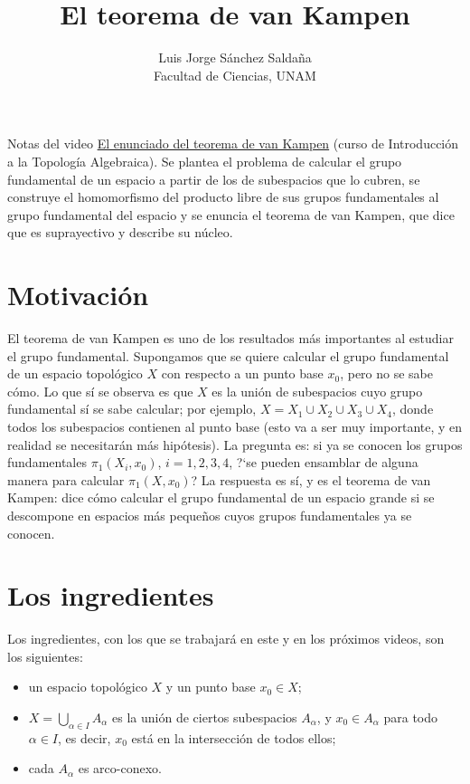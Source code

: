 \documentclass[11pt]{article}
\title{El teorema de van Kampen}
\author{Luis Jorge Sánchez Saldaña\\[2pt]\small Facultad de Ciencias, UNAM}
\date{}
\begin{document}
\maketitle

\noindent\small Notas del video
\href{https://www.youtube.com/watch?v=GbrKtJxBENo}{\guillemotleft{}El enunciado del teorema de van Kampen\guillemotright{}}
(curso de Introducción a la Topología Algebraica). Se plantea el problema de calcular el grupo fundamental de un espacio a partir de los de subespacios que lo cubren, se construye el homomorfismo del producto libre de sus grupos fundamentales al grupo fundamental del espacio y se enuncia el teorema de van Kampen, que dice que es suprayectivo y describe su núcleo.
\normalsize

\section*{Motivación}

El teorema de van Kampen es uno de los resultados más importantes al estudiar el grupo fundamental. Supongamos que se quiere calcular el grupo fundamental de un espacio topológico $X$ con respecto a un punto base $x_0$, pero no se sabe cómo. Lo que sí se observa es que $X$ es la unión de subespacios cuyo grupo fundamental sí se sabe calcular; por ejemplo, $X=X_1\cup X_2\cup X_3\cup X_4$, donde todos los subespacios contienen al punto base (esto va a ser muy importante, y en realidad se necesitarán más hipótesis). La pregunta es: si ya se conocen los grupos fundamentales $\pi_1(X_i,x_0)$, $i=1,2,3,4$, ?`se pueden ensamblar de alguna manera para calcular $\pi_1(X,x_0)$? La respuesta es sí, y es el teorema de van Kampen: dice cómo calcular el grupo fundamental de un espacio grande si se descompone en espacios más pequeños cuyos grupos fundamentales ya se conocen.

\section*{Los ingredientes}

Los ingredientes, con los que se trabajará en este y en los próximos videos, son los siguientes:
\begin{itemize}
  \item un espacio topológico $X$ y un punto base $x_0\in X$;
  \item $X=\bigcup_{\alpha\in I}A_\alpha$ es la unión de ciertos subespacios $A_\alpha$, y $x_0\in A_\alpha$ para todo $\alpha\in I$, es decir, $x_0$ está en la intersección de todos ellos;
  \item cada $A_\alpha$ es arco-conexo.
\end{itemize}
\end{document}
